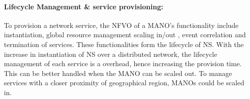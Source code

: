\paragraph{Lifecycle Management \& service provisioning:} To provision a network service, the NFVO of a MANO's functionality include instantiation, global resource management scaling in/out , event correlation and termination of services. These functionalities form the lifecycle of NS. With the increase in instantiation of NS over a distributed network, the lifecycle management of each service is a overhead, hence increasing the provision time. This can be better handled when the MANO can be scaled out. To manage services with a closer proximity of geographical region, MANOs could be scaled in.



